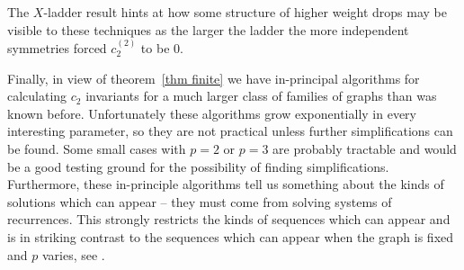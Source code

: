 \documentclass[12pt]{amsart}
\numberwithin{definition}{section}
\begin{document}
The $X$-ladder result hints at how some structure of higher weight drops may be visible to these techniques as the larger the ladder the more independent symmetries forced $c_2^{(2)}$ to be $0$.

Finally, in view of theorem~\ref{thm finite} we have in-principal algorithms for calculating $c_2$ invariants for a much larger class of families of graphs than was known before.  Unfortunately these algorithms grow exponentially in every interesting parameter, so they are not practical unless further simplifications can be found.  Some small cases with $p=2$ or $p=3$ are probably tractable and would be a good testing ground for the possibility of finding simplifications.  Furthermore, these in-principle algorithms tell us something about the kinds of solutions which can appear -- they must come from solving systems of recurrences.  This strongly restricts the kinds of sequences which can appear and is in striking contrast to the sequences which can appear when the graph is fixed and $p$ varies, see \cite{BrownSchnetz2013}.




 
\end{document}
